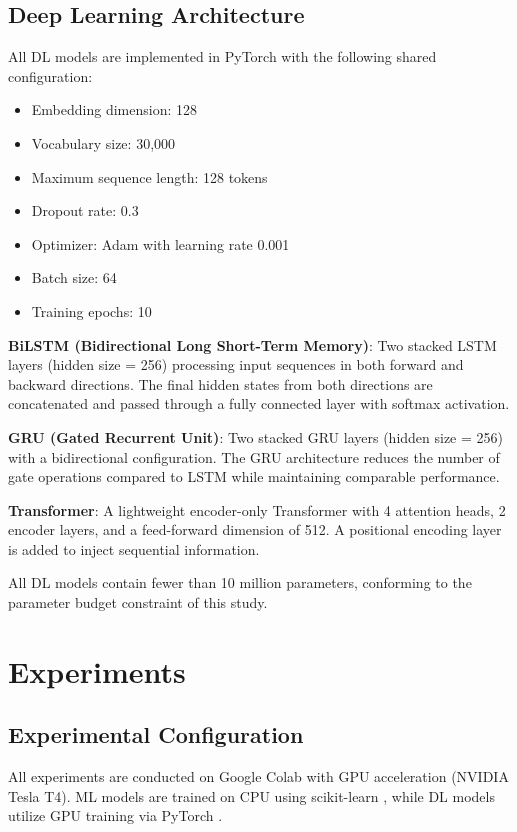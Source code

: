 \documentclass{article}
\begin{document}
\subsection{Deep Learning Architecture}

All DL models are implemented in PyTorch \cite{paszke2019pytorch} with the following shared configuration:

\begin{itemize}
\item Embedding dimension: 128
\item Vocabulary size: 30,000
\item Maximum sequence length: 128 tokens
\item Dropout rate: 0.3
\item Optimizer: Adam with learning rate 0.001
\item Batch size: 64
\item Training epochs: 10
\end{itemize}

\textbf{BiLSTM (Bidirectional Long Short-Term Memory)}: Two stacked LSTM layers (hidden size = 256) processing input sequences in both forward and backward directions. The final hidden states from both directions are concatenated and passed through a fully connected layer with softmax activation.

\textbf{GRU (Gated Recurrent Unit)}: Two stacked GRU layers (hidden size = 256) with a bidirectional configuration. The GRU architecture reduces the number of gate operations compared to LSTM while maintaining comparable performance.

\textbf{Transformer}: A lightweight encoder-only Transformer with 4 attention heads, 2 encoder layers, and a feed-forward dimension of 512. A positional encoding layer is added to inject sequential information.

All DL models contain fewer than 10 million parameters, conforming to the parameter budget constraint of this study.

\section{Experiments}

\subsection{Experimental Configuration}

All experiments are conducted on Google Colab with GPU acceleration (NVIDIA Tesla T4). ML models are trained on CPU using scikit-learn \cite{pedregosa2011scikit}, while DL models utilize GPU training via PyTorch \cite{paszke2019pytorch}.
\end{document}
